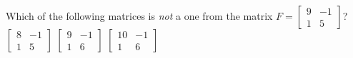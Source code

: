 



\begin{activity}
Which of the following matrices is \emph{not} a  one from the matrix \(F=\begin{bmatrix} 9&-1\\1&5 \end{bmatrix}\)?
{\(\begin{bmatrix} 8&-1\\1&5 \end{bmatrix}\)}
{\(\begin{bmatrix} 9&-1\\1&6 \end{bmatrix}\)}
{\(\begin{bmatrix} 10&-1\\1&6 \end{bmatrix}\)}
\end{activity}





